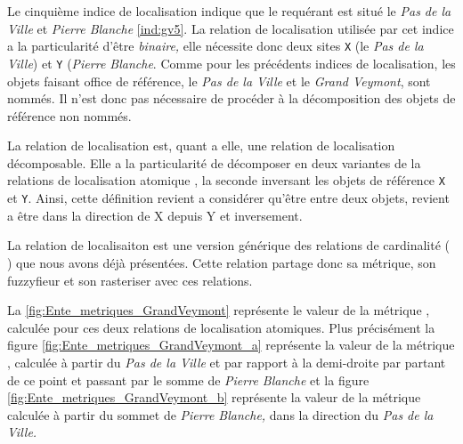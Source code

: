 Le cinquième indice de localisation indique que le requérant est situé
 le \emph{Pas de la Ville} et \emph{Pierre
  Blanche} \ref{ind:gv5}. La relation de localisation utilisée par cet
indice a la particularité d'être \emph{binaire,} elle nécessite donc
deux sites \texttt{X} (le \emph{Pas de la Ville}) et \texttt{Y}
(\emph{Pierre Blanche}. Comme pour les précédents indices de
localisation, les objets faisant office de référence, le \emph{Pas de
  la Ville} et le \emph{Grand Veymont}, sont nommés. Il n'est donc pas
nécessaire de procéder à la décomposition des objets de référence non
nommés.

La relation de localisation  est, quant a
elle, une relation de localisation décomposable. Elle a la
particularité de décomposer en deux variantes de la relations de
localisation atomique , la
seconde inversant les objets de référence \texttt{X} et
\texttt{Y}. Ainsi, cette définition revient a considérer qu'être entre
deux objets, revient a être dans la direction de X depuis Y et
inversement.

La relation de localisaiton  est
une version générique des relations de cardinalité (\eg
{}) que nous avons déjà présentées.
%
Cette relation partage donc sa métrique, son fuzzyfieur et son
rasteriser avec ces relations.

La \autoref{fig:Ente_metriques_GrandVeymont} représente le valeur de
la métrique , calculée pour ces deux
relations de localisation atomiques. Plus précisément la figure
\ref{fig:Ente_metriques_GrandVeymont_a} représente la valeur de la
métrique , calculée à partir du \emph{Pas
  de la Ville} et par rapport à la demi-droite par partant de ce point
et passant par le somme de \emph{Pierre Blanche} et la figure
\ref{fig:Ente_metriques_GrandVeymont_b} représente la valeur de la
métrique  calculée à partir du sommet de
\emph{Pierre Blanche,} dans la direction du \emph{Pas de la Ville.}

